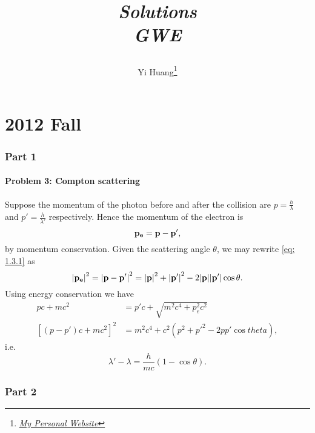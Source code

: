 \documentclass[10pt]{article}
\title{\begin{center}{\Huge \textit{Solutions}}\\{{\itshape GWE}}\end{center}}
\author{Yi Huang\footnote{\href{https://yiihuang.com/}{\textit{My Personal Website}}}}
\affiliation{
University of Minnesota
}
\begin{document}
	\maketitle
	\flushbottom
	\newpage
	\pagestyle{fancynotes}
\part{2012 Fall}
\section{Part 1}
\subsection{Problem 3: Compton scattering}
Suppose the momentum of the photon before and after the collision are $p = \frac{h}{\lambda}$ and $p' = \frac{h}{\lambda'}$ respectively. Hence the momentum of the electron is 
\begin{equation}
	\vb{p_e} = \vb{p} - \vb{p}', \label{eq: 1.3.1}
\end{equation}
by momentum conservation. Given the scattering angle $\theta$, we may rewrite \eqref{eq: 1.3.1} as 
\begin{equation}
	\abs{\vb{p_e}}^2 = \abs{\vb{p} - \vb{p}'}^2 = \abs{\vb{p}}^2 + \abs{\vb{p}'}^2 - 2 \abs{\vb{p}} \abs{\vb{p}'} \cos{\theta}. 
\end{equation}
Using energy conservation we have 
\begin{align*}
	pc + mc^2 &= p'c + \sqrt{m^2c^4 + p_e^2 c^2} \\
	[(p-p')c + mc^2]^2 &= m^2c^4 + c^2 (p^2 + p'^2 - 2pp'\cos{theta}),
\end{align*}
i.e. 
\begin{equation}
	\lambda' - \lambda = \frac{h}{mc} (1-\cos{\theta}).
\end{equation}

\section{Part 2}
\end{document}
